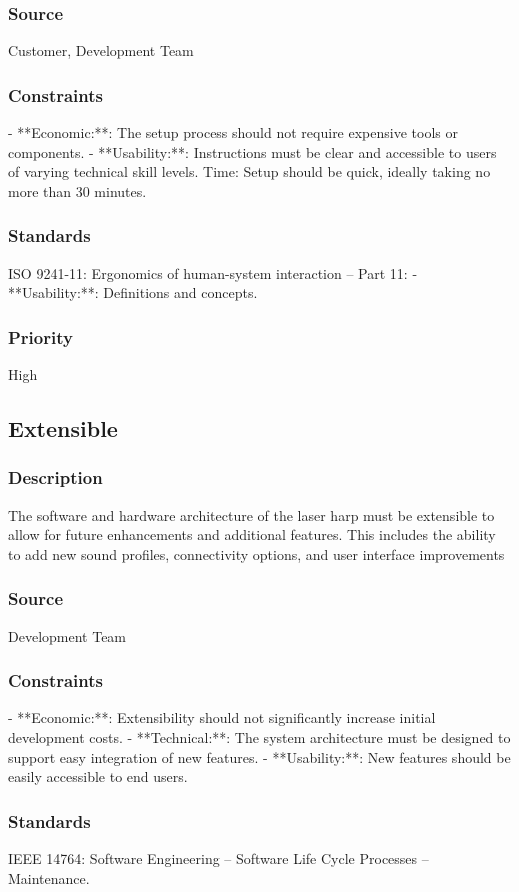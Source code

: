 \subsubsection{Source}
Customer, Development Team
\subsubsection{Constraints}
- **Economic:**: The setup process should not require expensive tools or components.
- **Usability:**: Instructions must be clear and accessible to users of varying technical skill levels.
Time: Setup should be quick, ideally taking no more than 30 minutes.
\subsubsection{Standards}
ISO 9241-11: Ergonomics of human-system interaction – Part 11: - **Usability:**: Definitions and concepts.
\subsubsection{Priority}
High


\subsection{Extensible}
\subsubsection{Description}
The software and hardware architecture of the laser harp must be extensible to allow for future enhancements and additional features. This includes the ability to add new sound profiles, connectivity options, and user interface improvements
\subsubsection{Source}
Development Team
\subsubsection{Constraints}
- **Economic:**: Extensibility should not significantly increase initial development costs.
- **Technical:**: The system architecture must be designed to support easy integration of new features.
- **Usability:**: New features should be easily accessible to end users.
\subsubsection{Standards}
IEEE 14764: Software Engineering – Software Life Cycle Processes – Maintenance.
